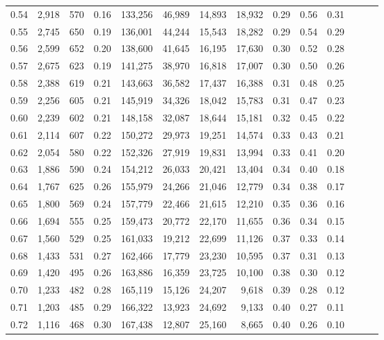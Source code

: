 \begin{tabular}{rrrrrrrrrrrrrr}
0.54 &  2,918 &  570 &  0.16 &  133,256 &   46,989 &  14,893 &  18,932 &  0.29 &  0.56 &      0.31 \\
0.55 &  2,745 &  650 &  0.19 &  136,001 &   44,244 &  15,543 &  18,282 &  0.29 &  0.54 &      0.29 \\
0.56 &  2,599 &  652 &  0.20 &  138,600 &   41,645 &  16,195 &  17,630 &  0.30 &  0.52 &      0.28 \\
0.57 &  2,675 &  623 &  0.19 &  141,275 &   38,970 &  16,818 &  17,007 &  0.30 &  0.50 &      0.26 \\
0.58 &  2,388 &  619 &  0.21 &  143,663 &   36,582 &  17,437 &  16,388 &  0.31 &  0.48 &      0.25 \\
0.59 &  2,256 &  605 &  0.21 &  145,919 &   34,326 &  18,042 &  15,783 &  0.31 &  0.47 &      0.23 \\
0.60 &  2,239 &  602 &  0.21 &  148,158 &   32,087 &  18,644 &  15,181 &  0.32 &  0.45 &      0.22 \\
0.61 &  2,114 &  607 &  0.22 &  150,272 &   29,973 &  19,251 &  14,574 &  0.33 &  0.43 &      0.21 \\
0.62 &  2,054 &  580 &  0.22 &  152,326 &   27,919 &  19,831 &  13,994 &  0.33 &  0.41 &      0.20 \\
0.63 &  1,886 &  590 &  0.24 &  154,212 &   26,033 &  20,421 &  13,404 &  0.34 &  0.40 &      0.18 \\
0.64 &  1,767 &  625 &  0.26 &  155,979 &   24,266 &  21,046 &  12,779 &  0.34 &  0.38 &      0.17 \\
0.65 &  1,800 &  569 &  0.24 &  157,779 &   22,466 &  21,615 &  12,210 &  0.35 &  0.36 &      0.16 \\
0.66 &  1,694 &  555 &  0.25 &  159,473 &   20,772 &  22,170 &  11,655 &  0.36 &  0.34 &      0.15 \\
0.67 &  1,560 &  529 &  0.25 &  161,033 &   19,212 &  22,699 &  11,126 &  0.37 &  0.33 &      0.14 \\
0.68 &  1,433 &  531 &  0.27 &  162,466 &   17,779 &  23,230 &  10,595 &  0.37 &  0.31 &      0.13 \\
0.69 &  1,420 &  495 &  0.26 &  163,886 &   16,359 &  23,725 &  10,100 &  0.38 &  0.30 &      0.12 \\
0.70 &  1,233 &  482 &  0.28 &  165,119 &   15,126 &  24,207 &   9,618 &  0.39 &  0.28 &      0.12 \\
0.71 &  1,203 &  485 &  0.29 &  166,322 &   13,923 &  24,692 &   9,133 &  0.40 &  0.27 &      0.11 \\
0.72 &  1,116 &  468 &  0.30 &  167,438 &   12,807 &  25,160 &   8,665 &  0.40 &  0.26 &      0.10 \\

\end{tabular}
